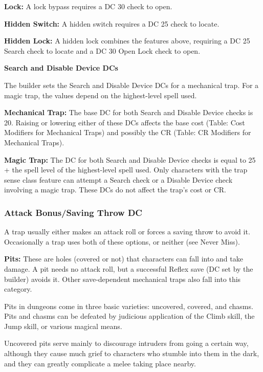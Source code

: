 \textbf{Lock:} A lock bypass requires a DC 30  check to open. 

\textbf{Hidden Switch:} A hidden switch requires a DC 25  check to locate.

\textbf{Hidden Lock:} A hidden lock combines the features above, requiring a DC 
25 Search check to locate and a DC 30 Open Lock check to open.

\vspace{12pt}
\textbf{Search and Disable Device DCs}

The builder sets the Search and Disable Device DCs for a mechanical trap. For a 
magic trap, the values depend on the highest-level spell used.

\textbf{Mechanical Trap:} The base DC for both Search and Disable Device checks 
is 20. Raising or lowering either of these DCs affects the base cost (Table: Cost 
Modifiers for Mechanical Traps) and possibly the CR (Table: CR Modifiers for Mechanical 
Traps). 

\textbf{Magic Trap:} The DC for both Search and Disable Device checks is equal 
to 25 + the spell level of the highest-level spell used. Only characters with the 
trap sense class feature can attempt a Search check or a Disable Device check involving 
a magic trap. These DCs do not affect the trap's cost or CR.

\subsubsection{Attack Bonus/Saving Throw DC}

A trap usually either makes an attack roll or forces a saving throw to avoid it. 
Occasionally a trap uses both of these options, or neither (see Never Miss).

\textbf{Pits:} These are holes (covered or not) that characters can fall into and 
take damage. A pit needs no attack roll, but a successful Reflex save (DC set by 
the builder) avoids it. Other save-dependent mechanical traps also fall into this 
category.

Pits in dungeons come in three basic varieties: uncovered, covered, and chasms. 
Pits and chasms can be defeated by judicious application of the Climb skill, the 
Jump skill, or various magical means.

Uncovered pits serve mainly to discourage intruders from going a certain way, although 
they cause much grief to characters who stumble into them in the dark, and they 
can greatly complicate a melee taking place nearby.

